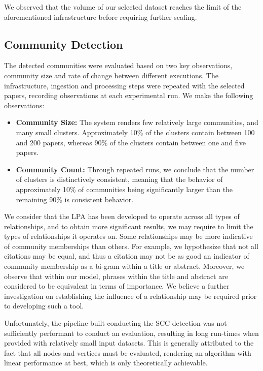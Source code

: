 \documentclass[10pt,journal,final,a4paper]{IEEEtran}
\begin{document}
We observed that the volume of our selected dataset reaches the limit of the aforementioned infrastructure before requiring further scaling.

\subsection{Community Detection}
The detected communities were evaluated based on two key observations, community size and rate of change between different executions. The infrastructure, ingestion and processing steps were repeated with the selected papers, recording observations at each experimental run. We make the following observations:
\begin{itemize}
\item \textbf{Community Size:} The system renders few relatively large communities, and many small clusters. Approximately 10\% of the clusters contain between 100 and 200 papers, whereas 90\% of the clusters contain between one and five papers.
\item \textbf{Community Count:} Through repeated runs, we conclude that the number of clusters is distinctively consistent, meaning that the behavior of approximately 10\% of communities being significantly larger than the remaining 90\% is consistent behavior.
\end{itemize}

We consider that the LPA has been developed to operate across all types of relationships, and to obtain more significant results, we may require to limit the types of relationships it operates on. Some relationships may be more indicative of community memberships than others. For example, we hypothesize that not all citations may be equal, and thus a citation may not be as good an indicator of community membership as a bi-gram within a title or abstract. Moreover, we observe that within our model, phrases within the title and abstract are considered to be equivalent in terms of importance. We believe a further investigation on establishing the influence of a relationship may be required prior to developing such a tool.

Unfortunately, the pipeline built conducting the SCC detection was not sufficiently performant to conduct an evaluation, resulting in long run-times when provided with relatively small input datasets. This is generally attributed to the fact that all nodes and vertices must be evaluated, rendering an algorithm with linear performance at best, which is only theoretically achievable.
 
\end{document}
